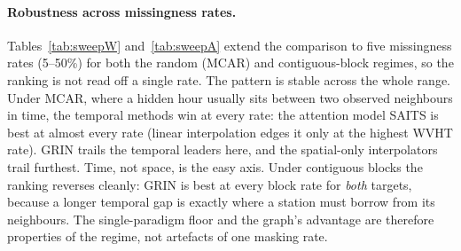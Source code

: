 \documentclass[11pt]{article}
\begin{document}
\begin{table}[t]
\centering
\caption{Imputation mean absolute error (lower is better). Station-outage is the
spatial regime; MCAR-50\% and Block-50\% are temporal regimes. GRIN values are
mean $\pm$ standard deviation over three model seeds. Best per column in bold.}
\label{tab:imp}
\small
{}
\end{table}

\paragraph{Robustness across missingness rates.}
Tables~\ref{tab:sweepW} and~\ref{tab:sweepA} extend the comparison to five
missingness rates (5--50\%) for both the random (MCAR) and contiguous-block
regimes, so the ranking is not read off a single rate. The pattern is stable
across the whole range. Under MCAR, where a hidden hour usually sits between two
observed neighbours in time, the temporal methods win at every rate: the attention
model SAITS is best at almost every rate (linear interpolation edges it only at the
highest WVHT rate). GRIN trails the temporal leaders here, and the spatial-only
interpolators trail furthest. Time, not space, is the easy axis. Under contiguous
blocks the ranking reverses cleanly: GRIN is best at every block rate for \emph{both}
targets, because a longer temporal gap is exactly where a station must borrow from
its neighbours. The single-paradigm floor and the graph's advantage are therefore
properties of the regime, not artefacts of one masking rate.

\begin{table}[t]
\centering
\caption{Imputation MAE for \textbf{WVHT} (m) across missingness rates, MCAR and
Block at 5/10/20/30/50\%. GRIN is the basin-aware graph (mean over three model
seeds). Lower is better; best per column in bold.}
\label{tab:sweepW}
\small
{}
\end{table}
\end{document}
